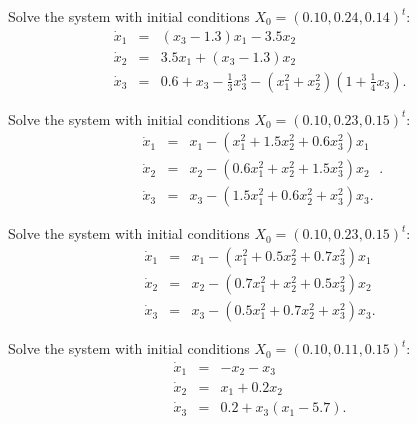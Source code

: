 \begin{exercise}  \label{c11.6.1d}
Solve the system  with initial conditions 
$X_0 = (0.10, 0.24, 0.14)^t$:
\begin{equation*} \label{e11.6.1d}
\begin{array}{rcl} 
\dot{x}_1 & = &   (x_3 - 1.3)x_1 - 3.5x_2 \\
\dot{x}_2 & = & 3.5x_1 + (x_3-1.3)x_2  \\
\dot{x}_3 & = &
0.6+x_3-\frac{1}{3}x_3^3-(x_1^2+x_2^2)(1+\frac{1}{4}x_3).\end{array}
\end{equation*}
\end{exercise}

\begin{exercise}  \label{c11.6.1c}
Solve the system  with initial conditions 
$X_0 = (0.10, 0.23, 0.15)^t$:
\begin{equation*} \label{e11.6.1c}
\begin{array}{rcl} 
\dot{x}_1 & = & x_1 - (x_1^2 + 1.5x_2^2 + 0.6x_3^2)x_1 \\
\dot{x}_2 & = & x_2 - (0.6x_1^2 + x_2^2 + 1.5x_3^2)x_2  \\
\dot{x}_3 & = & x_3 - (1.5x_1^2 + 0.6x_2^2 + x_3^2)x_3.   \end{array}. 
\end{equation*}
\end{exercise}

\begin{exercise}  \label{c11.6.1b}
Solve the system  with initial conditions 
$X_0 = (0.10, 0.23, 0.15)^t$:
\begin{equation*} \label{e11.6.1b}
\begin{array}{rcl} 
\dot{x}_1 & = & x_1 - (x_1^2 + 0.5x_2^2 + 0.7x_3^2)x_1 \\
\dot{x}_2 & = & x_2 - (0.7x_1^2 + x_2^2 + 0.5x_3^2)x_2  \\
\dot{x}_3 & = & x_3 - (0.5x_1^2 + 0.7x_2^2 + x_3^2)x_3.   \end{array}
\end{equation*}
\end{exercise}

\begin{exercise}  \label{c11.6.1e}             
Solve the system  with initial conditions 
$X_0 = (0.10, 0.11, 0.15)^t$:
\begin{equation*} \label{e11.6.1e}
\begin{array}{rcl} 
\dot{x}_1 & = & -x_2-x_3  \\
\dot{x}_2 & = &  x_1 + 0.2x_2 \\
\dot{x}_3 & = & 0.2 + x_3(x_1 - 5.7). \end{array}
\end{equation*}
\end{exercise}

